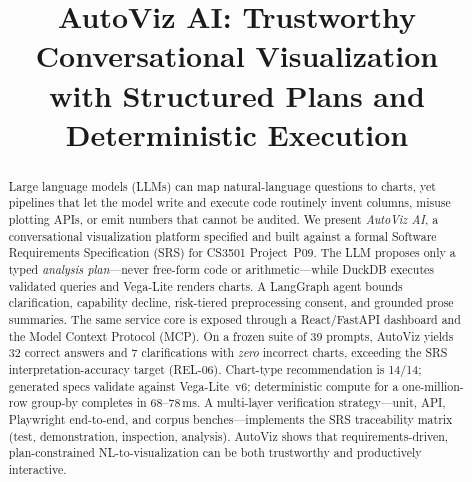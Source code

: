 \documentclass[conference]{IEEEtran}
\begin{document}
\title{AutoViz AI: Trustworthy Conversational Visualization\\
with Structured Plans and Deterministic Execution}

\author{
\and
{}
\and
{}
\linebreakand
{}
\and
{}
}

\maketitle

\begin{abstract}
Large language models (LLMs) can map natural-language questions to charts, yet pipelines that let the model write and execute code routinely invent columns, misuse plotting APIs, or emit numbers that cannot be audited. We present \emph{AutoViz AI}, a conversational visualization platform specified and built against a formal Software Requirements Specification (SRS) for CS3501 Project~P09. The LLM proposes only a typed \emph{analysis plan}---never free-form code or arithmetic---while DuckDB executes validated queries and Vega-Lite renders charts. A LangGraph agent bounds clarification, capability decline, risk-tiered preprocessing consent, and grounded prose summaries. The same service core is exposed through a React/FastAPI dashboard and the Model Context Protocol (MCP). On a frozen suite of 39 prompts, AutoViz yields 32 correct answers and 7 clarifications with \emph{zero} incorrect charts, exceeding the SRS interpretation-accuracy target (REL-06). Chart-type recommendation is 14/14; generated specs validate against Vega-Lite~v6; deterministic compute for a one-million-row group-by completes in 68--78\,ms. A multi-layer verification strategy---unit, API, Playwright end-to-end, and corpus benches---implements the SRS traceability matrix (test, demonstration, inspection, analysis). AutoViz shows that requirements-driven, plan-constrained NL-to-visualization can be both trustworthy and productively interactive.
\end{abstract}
\end{document}
